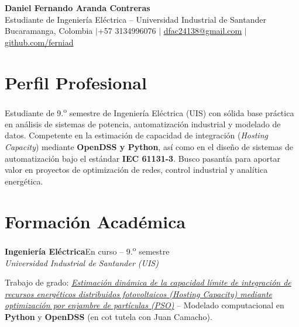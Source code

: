 \documentclass[10pt,a4paper]{article}
\newcommand{\entrada}[3]{%
    \noindent\textbf{\color{primario}#1}\hfill{\small\color{secundario}#2}\\[0pt]
    {\small\itshape\color{secundario}#3}\par\vspace{1pt}%
}
\begin{document}

\vspace{-10pt}
\begin{center}
    {\fontsize{20}{23}\selectfont\bfseries\color{primario} Daniel Fernando Aranda Contreras}\\[2pt]
    {\normalsize\color{secundario} Estudiante de Ingeniería Eléctrica -- Universidad Industrial de Santander}\\[3pt]
    {\small\color{texto}
        Bucaramanga, Colombia \quad$\vert$\quad +57 3134996076 \quad$\vert$\quad
        \href{mailto:dfac24138@gmail.com}{dfac24138@gmail.com} \quad$\vert$\quad
        \href{https://github.com/ferniad}{github.com/ferniad}
    }
\end{center}
\vspace{2pt}

\section*{Perfil Profesional}
Estudiante de 9.\textsuperscript{o} semestre de Ingeniería Eléctrica (UIS) con sólida base práctica en análisis de sistemas de potencia, automatización industrial y modelado de datos. Competente en la estimación de capacidad de integración (\textit{Hosting Capacity}) mediante \textbf{OpenDSS y Python}, así como en el diseño de sistemas de automatización bajo el estándar \textbf{IEC 61131-3}. Busco pasantía para aportar valor en proyectos de optimización de redes, control industrial y analítica energética.

\section*{Formación Académica}

\entrada{Ingeniería Eléctrica}{En curso -- 9.\textsuperscript{o} semestre}{Universidad Industrial de Santander (UIS)}
{\small\color{texto} Trabajo de grado: \href{https://www.zotero.org/groups/6637268/camacho-aranda-tesis-uis}{\itshape Estimación dinámica de la capacidad límite de integración de recursos energéticos distribuidos fotovoltaicos (Hosting Capacity) mediante optimización por enjambre de partículas (PSO)} -- Modelado computacional en \textbf{Python} y \textbf{OpenDSS} (en cot tutela con Juan Camacho).}
\vspace{2pt}
\end{document}
